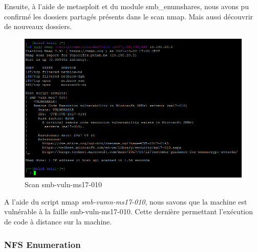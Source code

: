\documentclass[french,paper=a4,oneside,captions=tableheading]{article}
\begin{document}
Ensuite, à l'aide de metasploit et du module smb\_enumshares, nous avons pu confirmé les dossiers partagés présents dans le scan nmap. Mais aussi découvrir de nouveaux dossiers.

\begin{figure}[H]
    \centering
    \includegraphics[width=15cm]{images/Secu_Offensive_24.png}
    \caption{Scan smb-vuln-ms17-010}
    \label{fig:smb5}
\end{figure}

A l'aide du script nmap \textit{smb-vumn-ms17-010}, nous savons que la machine est vulnérable à la faille smb-vuln-ms17-010. Cette dernière permettant l'exécution de code à distance sur la machine.

\subsubsection{NFS Enumeration}
\end{document}

